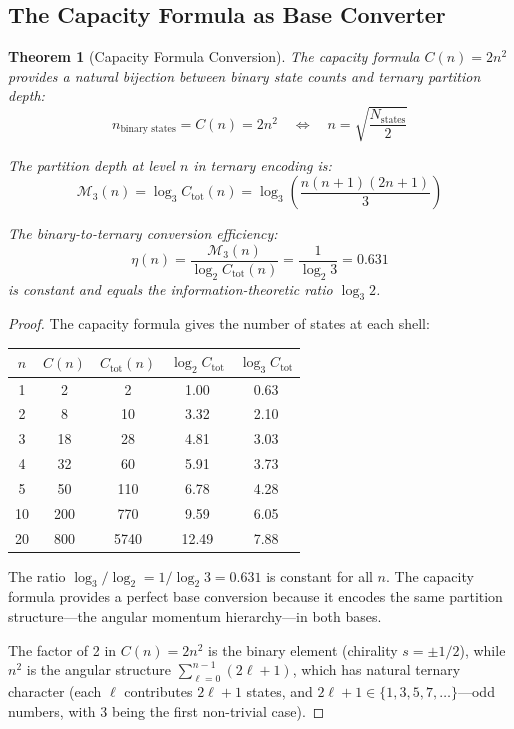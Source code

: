 \documentclass[twocolumn,10pt]{article}
\newtheorem{theorem}{Theorem}[section]
\theoremstyle{remark}
\newcommand{\Depth}{\mathcal{M}}
\begin{document}
\subsection{The Capacity Formula as Base Converter}

\begin{theorem}[Capacity Formula Conversion]
\label{thm:capacity_conversion}
The capacity formula $C(n) = 2n^2$ provides a natural bijection between binary state counts and ternary partition depth:
\begin{equation}
    n_{\text{binary states}} = C(n) = 2n^2 \quad \Leftrightarrow \quad n = \sqrt{\frac{N_{\text{states}}}{2}}
\end{equation}

The partition depth at level $n$ in ternary encoding is:
\begin{equation}
    \Depth_3(n) = \log_3 C_{\text{tot}}(n) = \log_3\left(\frac{n(n+1)(2n+1)}{3}\right)
\end{equation}

The binary-to-ternary conversion efficiency:
\begin{equation}
    \eta(n) = \frac{\Depth_3(n)}{\log_2 C_{\text{tot}}(n)} = \frac{1}{\log_2 3} = 0.631
\end{equation}
is constant and equals the information-theoretic ratio $\log_3 2$.
\end{theorem}

\begin{proof}
The capacity formula gives the number of states at each shell:
\begin{center}
\begin{tabular}{ccccc}
\toprule
$n$ & $C(n)$ & $C_{\text{tot}}(n)$ & $\log_2 C_{\text{tot}}$ & $\log_3 C_{\text{tot}}$ \\
\midrule
1 & 2 & 2 & 1.00 & 0.63 \\
2 & 8 & 10 & 3.32 & 2.10 \\
3 & 18 & 28 & 4.81 & 3.03 \\
4 & 32 & 60 & 5.91 & 3.73 \\
5 & 50 & 110 & 6.78 & 4.28 \\
10 & 200 & 770 & 9.59 & 6.05 \\
20 & 800 & 5740 & 12.49 & 7.88 \\
\bottomrule
\end{tabular}
\end{center}

The ratio $\log_3 / \log_2 = 1/\log_2 3 = 0.631$ is constant for all $n$. The capacity formula provides a perfect base conversion because it encodes the same partition structure---the angular momentum hierarchy---in both bases.

The factor of 2 in $C(n) = 2n^2$ is the binary element (chirality $s = \pm 1/2$), while $n^2$ is the angular structure $\sum_{\ell=0}^{n-1}(2\ell+1)$, which has natural ternary character (each $\ell$ contributes $2\ell+1$ states, and $2\ell+1 \in \{1, 3, 5, 7, \ldots\}$---odd numbers, with 3 being the first non-trivial case).
\end{proof}
\end{document}
